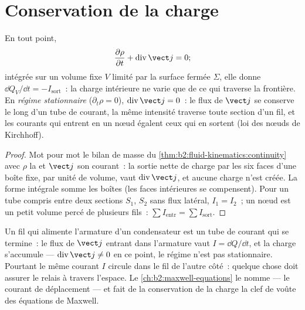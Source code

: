 \section{Conservation de la charge}

\begin{theorem}\label{thm:b2:charges-currents-conduction:conservation}
En tout point,
\[
\frac{\partial\rho}{\partial t} + \operatorname{div}\vect j = 0 ;
\]
intégrée sur un volume fixe $V$ limité par la surface fermée $\Sigma$, elle donne
$\dd Q_V/\dd t = -I_{\text{sort}}$~: la charge intérieure ne varie que de ce qui
traverse la frontière. En \emph{régime stationnaire} ($\partial_t\rho = 0$),
$\operatorname{div}\vect j = 0$~: le flux de $\vect j$ se conserve le long d'un tube
de courant, la même intensité traverse toute section d'un fil, et
les courants qui entrent en un nœud égalent ceux qui en sortent (loi des nœuds de Kirchhoff).
\end{theorem}

\begin{proof}
Mot pour mot le bilan de masse du \cref{thm:b2:fluid-kinematics:continuity}
avec $\rho$ la  et $\vect j$ son courant~: la sortie nette
de charge par les six faces d'une boîte fixe, par unité de volume, vaut
$\operatorname{div}\vect j$, et aucune charge n'est créée. La forme intégrale somme
les boîtes (les faces intérieures se compensent). Pour un tube compris entre deux sections
$S_1$, $S_2$ sans flux latéral, $I_1 = I_2$~; un nœud est un
petit volume percé de plusieurs fils~: $\sum I_{\text{entr}} = \sum I_{\text{sort}}$.
\end{proof}

\begin{remark}\label{rem:b2:charges-currents-conduction:capacitor}
Un fil qui alimente l'armature d'un condensateur est un tube de courant qui se termine~: le
flux de $\vect j$ entrant dans l'armature vaut $I = \dd Q/\dd t$, et la charge s'accumule
--- $\operatorname{div}\vect j \ne 0$ en ce point, le régime n'est pas stationnaire.
Pourtant le même courant $I$ circule dans le fil de l'autre côté~: quelque chose
doit assurer le relais à travers l'espace. Le \cref{ch:b2:maxwell-equations}
le nomme --- le courant de déplacement --- et fait de la conservation de la
charge la clef de voûte des équations de Maxwell.
\end{remark}

